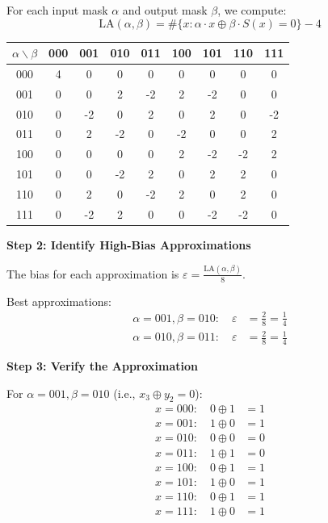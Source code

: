 \documentclass[12pt,a4paper]{article}
\newcommand{\bias}{\varepsilon}
\newcommand{\xor}{\oplus}
\newcommand{\LA}{\text{LA}}
\begin{document}
For each input mask $\alpha$ and output mask $\beta$, we compute:
$$\LA(\alpha, \beta) = \#\{x : \alpha \cdot x \xor \beta \cdot S(x) = 0\} - 4$$

\begin{center}
\begin{tabular}{c|cccccccc}
$\alpha \backslash \beta$ & 000 & 001 & 010 & 011 & 100 & 101 & 110 & 111 \\
\hline
000 & 4 & 0 & 0 & 0 & 0 & 0 & 0 & 0 \\
001 & 0 & 0 & 2 & -2 & 2 & -2 & 0 & 0 \\
010 & 0 & -2 & 0 & 2 & 0 & 2 & 0 & -2 \\
011 & 0 & 2 & -2 & 0 & -2 & 0 & 0 & 2 \\
100 & 0 & 0 & 0 & 0 & 2 & -2 & -2 & 2 \\
101 & 0 & 0 & -2 & 2 & 0 & 2 & 2 & 0 \\
110 & 0 & 2 & 0 & -2 & 2 & 0 & 2 & 0 \\
111 & 0 & -2 & 2 & 0 & 0 & -2 & -2 & 0 \\
\end{tabular}
\end{center}

\textbf{Step 2: Identify High-Bias Approximations}

The bias for each approximation is $\bias = \frac{\LA(\alpha, \beta)}{8}$.

Best approximations:
\begin{align}
\alpha = 001, \beta = 010: \quad \bias &= \frac{2}{8} = \frac{1}{4} \\
\alpha = 010, \beta = 011: \quad \bias &= \frac{2}{8} = \frac{1}{4}
\end{align}

\textbf{Step 3: Verify the Approximation}

For $\alpha = 001, \beta = 010$ (i.e., $x_3 \xor y_2 = 0$):
\begin{align}
x = 000: \quad 0 \xor 1 &= 1 \\
x = 001: \quad 1 \xor 0 &= 1 \\
x = 010: \quad 0 \xor 0 &= 0 \\
x = 011: \quad 1 \xor 1 &= 0 \\
x = 100: \quad 0 \xor 1 &= 1 \\
x = 101: \quad 1 \xor 0 &= 1 \\
x = 110: \quad 0 \xor 1 &= 1 \\
x = 111: \quad 1 \xor 0 &= 1
\end{align}
\end{document}
